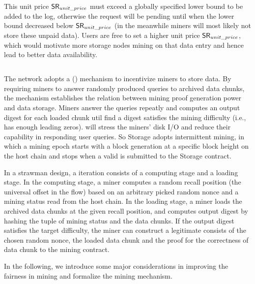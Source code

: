 This unit price $\mathsf{SR}_{unit\_price}$ must exceed a globally specified lower bound to be added to the log, otherwise the request will be pending until when the lower bound decreased below $\mathsf{SR}_{unit\_price}$ (in the meanwhile miners will most likely not store these unpaid data).
Users are free to set a higher unit price $\mathsf{SR}_{unit\_price}$,
which would motivate more storage nodes mining on that data entry and hence lead to better data availability.



\subsection{\proof}

The \project network adopts a \proof (\sproof) mechanism to incentivize miners to store data.
%
By requiring miners to answer randomly produced queries to archived data chunks, the \sproof mechanism establishes the relation between mining proof generation power and data storage.
%
Miners answer the queries repeatly and computes an output digest for each loaded chunk util find a digest satisfies the mining difficulty (i.e., has enough leading zeros). 
%
{\sproof} will stress the miners' disk I/O and reduce their capability in responding user queries.
%
So \projabbrev Storage adopts intermittent mining, in which 
%
a mining epoch starts with a block generation at a specific block height on the host chain and stops when a valid {\sproof} is submitted to the \projabbrev Storage contract. 

In a strawman design, a \sproof iteration consists of a computing stage and a loading stage. 
%
In the computing stage, a miner computes a random recall position (the universal offset in the flow) based on an arbitrary picked random nonce and a mining status read from the host chain.
%
In the loading stage, a miner loads the archived data chunks at the given recall position, and computes output digest by hashing the tuple of mining status and the data chunks. 
%
If the output digest satisfies the target difficulty, the miner can construct a legitimate \sproof consists of the chosen random nonce, the loaded data chunk and the proof for the correctness of data chunk to the mining contract. 

In the following, we introduce some major considerations in improving the fairness in {\sproof} mining and formalize the {\sproof} mining mechanism. 

%


